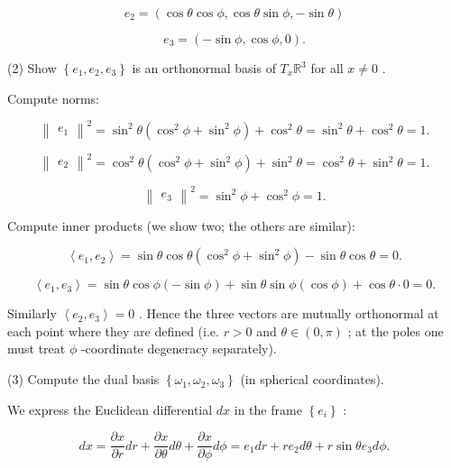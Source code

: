 \documentclass[10pt]{article}
\begin{document}
\[
{e}_{2} = \left( {\cos \theta \cos \phi ,\cos \theta \sin \phi , - \sin \theta }\right)
\]

\[
{e}_{3} = \left( {-\sin \phi ,\cos \phi ,0}\right) .
\]

(2) Show \(\left\{  {{e}_{1},{e}_{2},{e}_{3}}\right\}\) is an orthonormal basis of \({T}_{x}{\mathbb{R}}^{3}\) for all \(x \neq  0\) .

Compute norms:

\[
{\begin{Vmatrix}{e}_{1}\end{Vmatrix}}^{2} = {\sin }^{2}\theta \left( {{\cos }^{2}\phi  + {\sin }^{2}\phi }\right)  + {\cos }^{2}\theta  = {\sin }^{2}\theta  + {\cos }^{2}\theta  = 1.
\]

\[
{\begin{Vmatrix}{e}_{2}\end{Vmatrix}}^{2} = {\cos }^{2}\theta \left( {{\cos }^{2}\phi  + {\sin }^{2}\phi }\right)  + {\sin }^{2}\theta  = {\cos }^{2}\theta  + {\sin }^{2}\theta  = 1.
\]

\[
{\begin{Vmatrix}{e}_{3}\end{Vmatrix}}^{2} = {\sin }^{2}\phi  + {\cos }^{2}\phi  = 1.
\]

Compute inner products (we show two; the others are similar):

\[
\left\langle  {{e}_{1},{e}_{2}}\right\rangle   = \sin \theta \cos \theta \left( {{\cos }^{2}\phi  + {\sin }^{2}\phi }\right)  - \sin \theta \cos \theta  = 0.
\]

\[
\left\langle  {{e}_{1},{e}_{3}}\right\rangle   = \sin \theta \cos \phi \left( {-\sin \phi }\right)  + \sin \theta \sin \phi \left( {\cos \phi }\right)  + \cos \theta  \cdot  0 = 0.
\]

Similarly \(\left\langle  {{e}_{2},{e}_{3}}\right\rangle   = 0\) . Hence the three vectors are mutually orthonormal at each point where they are defined (i.e. \(r > 0\) and \(\theta  \in  \left( {0,\pi }\right)\) ; at the poles one must treat \(\phi\) -coordinate degeneracy separately).

(3) Compute the dual basis \(\left\{  {{\omega }_{1},{\omega }_{2},{\omega }_{3}}\right\}\) (in spherical coordinates).

We express the Euclidean differential \({dx}\) in the frame \(\left\{  {e}_{i}\right\}\) :

\[
{dx} = \frac{\partial x}{\partial r}{dr} + \frac{\partial x}{\partial \theta }{d\theta } + \frac{\partial x}{\partial \phi }{d\phi } = {e}_{1}{dr} + r{e}_{2}{d\theta } + r\sin \theta {e}_{3}{d\phi }.
\]
\end{document}
